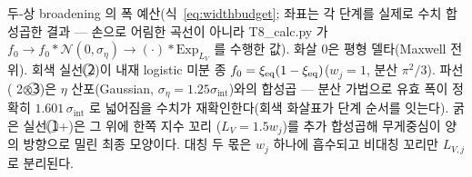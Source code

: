 \caption{두-상 broadening 의 폭 예산(식~\eqref{eq:widthbudget}; 좌표는 각 단계를 실제로 수치 합성곱한
결과 — 손으로 어림한 곡선이 아니라 T8\_calc.py 가 $f_0\!\to\!f_0{*}\mathcal N(0,\sigma_\eta)\!\to\!(\cdot){*}\mathrm{Exp}_{L_V}$
를 수행한 값). 화살 0은 평형 델타(Maxwell 전위). 회색 실선(\textcircled{\scriptsize 2})이 내재
logistic 미분 종 $f_0=\xi_\eq(1-\xi_\eq)$($w_j{=}1$, 분산 $\pi^2/3$). 파선(\textcircled{\scriptsize
2}$\otimes$\textcircled{\scriptsize 3})은 $\eta$ 산포(Gaussian, $\sigma_\eta{=}1.25\sigma_\mathrm{int}$)와의
합성곱 — 분산 가법으로 유효 폭이 정확히 $1.601\,\sigma_\mathrm{int}$ 로 넓어짐을 수치가 재확인한다(회색
화살표가 단계 순서를 잇는다). 굵은 실선(\textcircled{\scriptsize 1}$+$)은 그 위에 한쪽 지수 꼬리
($L_V{=}1.5w_j$)를 추가 합성곱해 무게중심이 양의 방향으로 밀린 최종 모양이다. 대칭 두 몫은 $w_j$ 하나에
흡수되고 비대칭 꼬리만 $L_{V,j}$ 로 분리된다.}
\label{fig:widthbudget}
